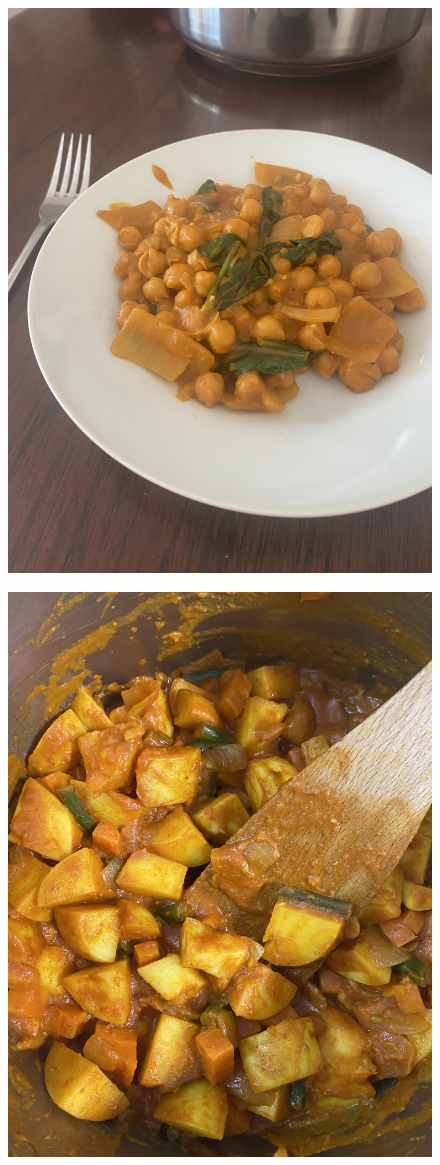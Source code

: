 \documentclass[]{article}
\begin{document}
\newpage\begin{figure}[H]
\begin{center}\hyperref[rec:Chickpea Curry]{\includegraphics[keepaspectratio,width=\textheight,height=\textwidth,angle=-90]{Gallery/Chickpea Curry}}\caption*{}\label{fig:Chickpea Curry}\end{center}
\end{figure}
\newpage\begin{figure}[H]
\begin{center}\hyperref[rec:Potato Curry]{\includegraphics[keepaspectratio,width=\textheight,height=\textwidth,angle=-90]{Gallery/Potato Curry}}\caption*{}\label{fig:Potato Curry}\end{center}
\end{figure}
\end{document}
